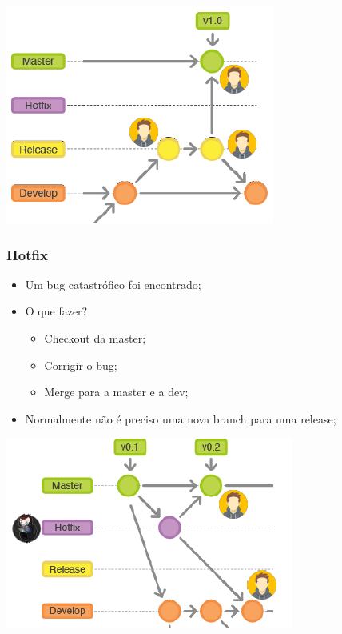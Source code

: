 \documentclass{article}
\begin{document}
 \begin{center}
  \includegraphics[scale=0.6]{50}
 \end{center}

\pagebreak

\subsubsection*{Hotfix}

\begin{itemize}
  \item Um bug catastrófico foi encontrado;
  \item O que fazer?
  \begin{itemize}
    \item Checkout da master;
    \item Corrigir o bug;
    \item Merge para a master e a dev;
  \end{itemize}
  \item Normalmente não é preciso uma nova branch para uma release;
\end{itemize}

\begin{center}
  \includegraphics[scale=0.6]{51}
\end{center}
\end{document}
